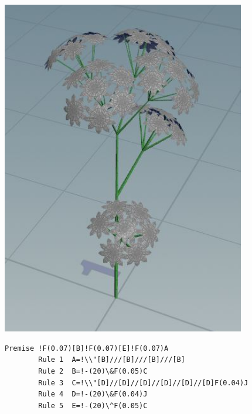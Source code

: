 \documentclass[paper=a4,fontsize=12pt,ngerman]{scrartcl}
\begin{document}
	\begin{minipage}{0.3\textwidth}
		\includegraphics[width=0.8\textwidth]{graphics/flowerone1.JPG}
	\end{minipage}
	\begin{minipage}{0.7\textwidth}
	\begin{lstlisting}[caption={Flower One},basicstyle=\scriptsize]
		Premise !F(0.07)[B]!F(0.07)[E]!F(0.07)A
		Rule 1	A=!\\"[B]///[B]///[B]///[B]
		Rule 2	B=!-(20)\&F(0.05)C
		Rule 3	C=!\\"[D]//[D]//[D]//[D]//[D]//[D]F(0.04)J
		Rule 4	D=!-(20)\&F(0.04)J
		Rule 5	E=!-(20)\^F(0.05)C
	\end{lstlisting} 
	\end{minipage}
\end{document}
